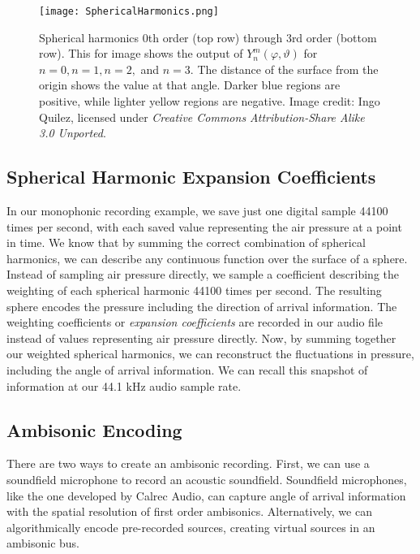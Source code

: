 \begin{figure}[h]
  \texttt{[image: SphericalHarmonics.png]}
  \caption{Spherical harmonics $0$th order (top row) through $3$rd
    order (bottom row). This for image shows the output of
    $Y_{n}^{m}(\varphi,\vartheta)$ for $n=0,n=1,n=2,$ and $n=3$. The
    distance of the surface from the origin shows the value at that
    angle. Darker blue regions are positive, while lighter yellow
    regions are negative. Image credit: Ingo Quilez, licensed under
    \textit{Creative Commons Attribution-Share Alike 3.0 Unported}.}
  \label{fig:spherical-harmonics}
\end{figure}

\subsection{Spherical Harmonic Expansion Coefficients}
\label{sec:spher-harm-expans}
In our monophonic recording example, we save just one digital sample
44100 times per second, with each saved value representing the air
pressure at a point in time. We know that by summing the correct
combination of spherical harmonics, we can describe any continuous
function over the surface of a sphere. Instead of sampling air
pressure directly, we sample a coefficient describing the weighting of
each spherical harmonic 44100 times per second. The resulting sphere
encodes the pressure including the direction of arrival
information. The weighting coefficients or \textit{expansion
  coefficients} are recorded in our audio file instead of values
representing air pressure directly. Now, by summing together our
weighted spherical harmonics, we can reconstruct the fluctuations in
pressure, including the angle of arrival information. We can recall
this snapshot of information at our 44.1 kHz audio sample rate.

\subsection{Ambisonic Encoding}
\label{sec:usage}
There are two ways to create an ambisonic recording. First, we can use
a soundfield microphone to record an acoustic soundfield. Soundfield
microphones, like the one developed by Calrec Audio, can capture angle
of arrival information with the spatial resolution of first order
ambisonics.\cite[-1in]{Ferrar1979} Alternatively, we can algorithmically
encode pre-recorded sources, creating virtual sources in an
ambisonic bus.\cite[-0.4in]{Malham1995}

